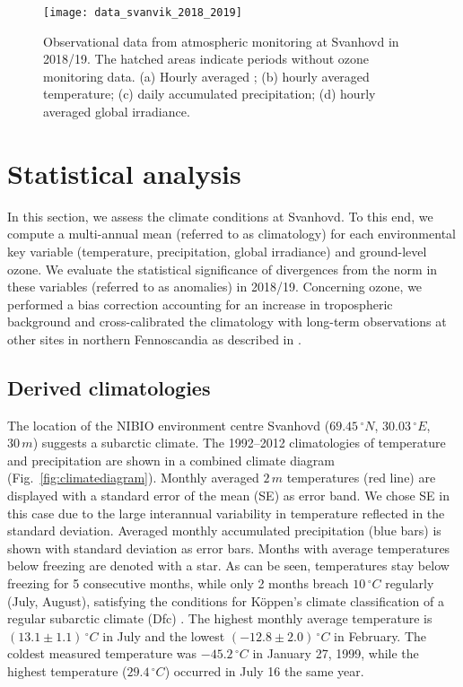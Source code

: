 \documentclass[bg, manuscript]{copernicus}
\begin{document}
\begin{figure*}[t]
  \texttt{[image: data\_svanvik\_2018\_2019]}
  \caption{Observational data from atmospheric monitoring at Svanhovd in 2018/19. The hatched areas indicate periods without ozone monitoring data. (a) Hourly averaged \chem{[O_3]}; (b) hourly averaged temperature; (c) daily accumulated precipitation; (d) hourly averaged global irradiance.}
  \label{fig:data_svanvik_2018_2019}
\end{figure*}

\section{Statistical analysis}
\label{sec:stats}
In this section, we assess the climate conditions at Svanhovd. To this end, we compute a multi-annual mean (referred to as climatology) for each environmental key variable (temperature, precipitation, global irradiance) and ground-level ozone. We evaluate the statistical significance of divergences from the norm in these variables (referred to as anomalies) in 2018/19. Concerning ozone, we performed a bias correction accounting for an increase in tropospheric background \chem{[O_3]} and cross-calibrated the climatology with long-term observations at other sites in northern Fennoscandia as described in \citet{ACPD:Falk2021}.

\subsection{Derived climatologies}
\label{subsec:climatologies}

The location of the NIBIO environment centre Svanhovd ($69.45\,\unit{^\circ N}$, $30.03\,\unit{^\circ E}$, $30\,\unit{m}$) suggests a subarctic climate. The 1992--2012 climatologies of temperature and precipitation are shown in a combined climate diagram (Fig.~\ref{fig:climatediagram}). Monthly averaged $2\,\unit{m}$ temperatures (red line) are displayed with a standard error of the mean (SE) as error band. We chose SE in this case due to the large interannual variability in temperature reflected in the standard deviation. Averaged monthly accumulated precipitation (blue bars) is shown with standard deviation as error bars. Months with average temperatures below freezing are denoted with a star. As can be seen, temperatures stay below freezing for 5 consecutive months, while only 2 months breach $10\,\unit{^\circ C}$ regularly (July, August), satisfying the conditions for K\"{o}ppen's climate classification of a regular subarctic climate (Dfc) \citep[e.g.][]{SD:Beck2018}. The highest monthly average temperature is $(13.1\pm 1.1)\,\unit{^\circ C}$ in July and the lowest $(-12.8\pm 2.0)\,\unit{^\circ C}$ in February. The coldest measured temperature was $-45.2\,\unit{^\circ C}$ in January 27, 1999, while the highest temperature ($29.4\,\unit{^\circ C}$) occurred in July 16 the same year.
\end{document}
